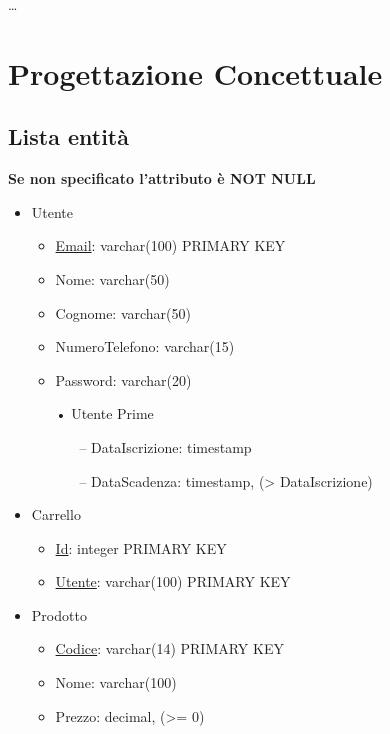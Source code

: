\documentclass[11pt]{article}
\begin{document}
\dots

\section{Progettazione Concettuale}

\subsection{Lista entità}

\textbf{Se non specificato l'attributo è NOT NULL}
\begin{itemize}
    \item Utente
    \begin{itemize}
        \item \underline{Email}: varchar(100) PRIMARY KEY
        \item Nome: varchar(50)
        \item Cognome: varchar(50)
        \item NumeroTelefono: varchar(15)
        \item Password: varchar(20)
        \item[•] Utente Prime
        \begin{itemize}
            \item[–] DataIscrizione: timestamp
            \item[–] DataScadenza: timestamp, (\textgreater{} DataIscrizione)
        \end{itemize}
    \end{itemize}
    \item Carrello
    \begin{itemize}
        \item \underline{Id}: integer PRIMARY KEY
        \item \underline{Utente}: varchar(100) PRIMARY KEY
    \end{itemize}
    \item Prodotto
    \begin{itemize}
        \item \underline{Codice}: varchar(14) PRIMARY KEY
        \item Nome: varchar(100)
        \item Prezzo: decimal, (\textgreater{}= 0)

\end{itemize}
\end{itemize}
\end{document}
